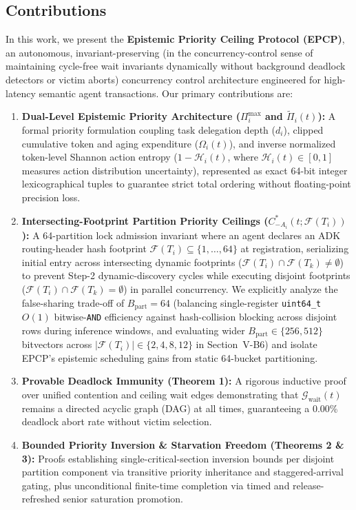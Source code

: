 \documentclass[conference,10pt]{IEEEtran}
\begin{document}
\subsection{Contributions}
In this work, we present the \textbf{Epistemic Priority Ceiling Protocol (EPCP)}, an autonomous, invariant-preserving (in the concurrency-control sense of maintaining cycle-free wait invariants dynamically without background deadlock detectors or victim aborts) concurrency control architecture engineered for high-latency semantic agent transactions. Our primary contributions are:
\begin{enumerate}
    \item \textbf{Dual-Level Epistemic Priority Architecture ($\Pi_i^{\max}$ and $\tilde{\Pi}_i(t)$):} A formal priority formulation coupling task delegation depth ($d_i$), clipped cumulative token and aging expenditure ($\Omega_i(t)$), and inverse normalized token-level Shannon action entropy ($1 - \mathcal{H}_i(t)$, where $\mathcal{H}_i(t) \in [0, 1]$ measures action distribution uncertainty), represented as exact 64-bit integer lexicographical tuples to guarantee strict total ordering without floating-point precision loss.
    \item \textbf{Intersecting-Footprint Partition Priority Ceilings ($C_{-A_i}^*(t; \mathcal{F}(T_i))$):} A 64-partition lock admission invariant where an agent declares an ADK routing-header hash footprint $\mathcal{F}(T_i) \subseteq \{1, \dots, 64\}$ at registration, serializing initial entry across intersecting dynamic footprints ($\mathcal{F}(T_i) \cap \mathcal{F}(T_k) \ne \emptyset$) to prevent Step-2 dynamic-discovery cycles while executing disjoint footprints ($\mathcal{F}(T_i) \cap \mathcal{F}(T_k) = \emptyset$) in parallel concurrency. We explicitly analyze the false-sharing trade-off of $B_{\text{part}} = 64$ (balancing single-register \texttt{uint64\_t} $O(1)$ bitwise-\texttt{AND} efficiency against hash-collision blocking across disjoint rows during inference windows, and evaluating wider $B_{\text{part}} \in \{256, 512\}$ bitvectors across $|\mathcal{F}(T_i)| \in \{2, 4, 8, 12\}$ in Section~V-B6) and isolate EPCP's epistemic scheduling gains from static 64-bucket partitioning.
    \item \textbf{Provable Deadlock Immunity (Theorem 1):} A rigorous inductive proof over unified contention and ceiling wait edges demonstrating that $\mathcal{G}_{\text{wait}}(t)$ remains a directed acyclic graph (DAG) at all times, guaranteeing a 0.00\% deadlock abort rate without victim selection.
    \item \textbf{Bounded Priority Inversion \& Starvation Freedom (Theorems 2 \& 3):} Proofs establishing single-critical-section inversion bounds per disjoint partition component via transitive priority inheritance and staggered-arrival gating, plus unconditional finite-time completion via timed and release-refreshed senior saturation promotion.

\end{enumerate}
\end{document}
